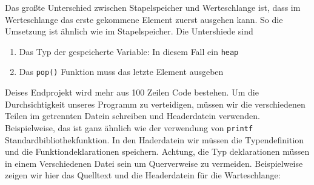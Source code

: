Das großte Unterschied zwischen Stapelspeicher und 
Werteschlange ist, dass im Werteschlange das erste gekommene Element zuerst ausgehen kann. 
So die Umsetzung ist ähnlich wie im Stapelspeicher. Die Untershiede sind
\begin{enumerate}
\item Das Typ der gespeicherte Variable: In diesem Fall ein \texttt{heap}
\item Das \texttt{pop()} Funktion muss das letzte Element ausgeben
\end{enumerate}

Deises Endprojekt wird mehr aus 100 Zeilen Code bestehen.
Um die Durchsichtigkeit unseres Programm zu verteidigen, müssen
wir die verschiedenen Teilen im getrennten Datein schreiben und
Headerdatein verwenden. Beispielweise, das ist ganz ähnlich wie der 
verwendung von \texttt{printf} Standardbibliothekfunktion. In den Haderdatein
wir müssen die Typendefinition und die Funktiondeklarationen speichern. Achtung, 
die Typ deklarationen müssen in einem Verschiedenen Datei sein um Querverweise zu vermeiden.
Beispielweise zeigen wir hier das Quelltext und die Headerdatein für die Warteschlange:

